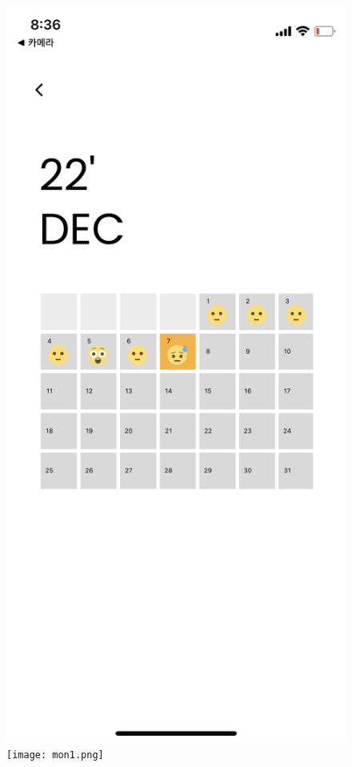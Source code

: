 \documentclass[conference]{IEEEtran}
\begin{document}
\begin{enumerate}
\begin{enumerate}
        \begin{figure}[H]
         \centering
         \includegraphics[scale=0.1]{UseCases/5.calendar.png}
         \texttt{[image: mon1.png]}
         \end{figure}

\end{enumerate}
\end{enumerate}
\end{document}
